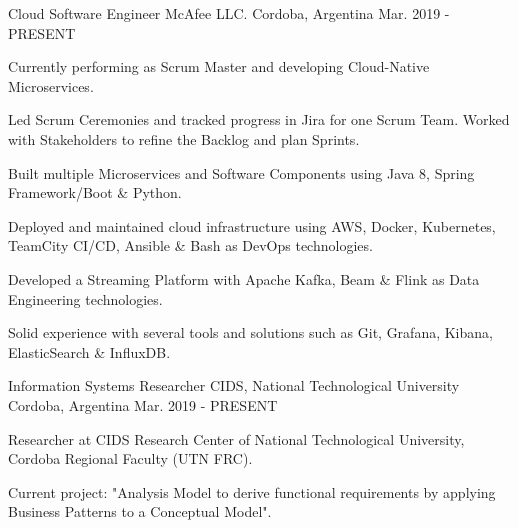 

\begin{cventries}

  \cventry
    {Cloud Software Engineer} %
    {McAfee LLC.} %
    {Cordoba, Argentina} %
    {Mar. 2019 - PRESENT} %
    {
      \begin{cvitems} %
        \item {Currently performing as Scrum Master and developing Cloud-Native Microservices.}
        \item {Led Scrum Ceremonies and tracked progress in Jira for one Scrum Team. Worked with Stakeholders to refine the Backlog and plan Sprints.}
        \item {Built multiple Microservices and Software Components using Java 8, Spring Framework/Boot \& Python.}
        \item {Deployed and maintained cloud infrastructure using AWS, Docker, Kubernetes, TeamCity CI/CD, Ansible \& Bash as DevOps technologies.}
        \item {Developed a Streaming Platform with Apache Kafka, Beam \& Flink as Data Engineering technologies.}
        \item {Solid experience with several tools and solutions such as Git, Grafana, Kibana, ElasticSearch \& InfluxDB.}
      \end{cvitems}
    }

  \cventry
    {Information Systems Researcher} %
    {CIDS, National Technological University} %
    {Cordoba, Argentina} %
    {Mar. 2019 - PRESENT} %
    {
      \begin{cvitems} %
        \item {Researcher at CIDS Research Center of National Technological University, Cordoba Regional Faculty (UTN FRC).}
        \item {Current project: "Analysis Model to derive functional requirements by applying Business Patterns to a Conceptual Model".}
      \end{cvitems}
    }


\end{cventries}
